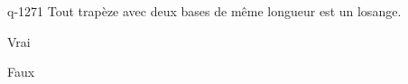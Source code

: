\begin{truefalse}{q-1271}
Tout trapèze avec deux bases de même longueur est un losange.
\item Vrai
\item* Faux
\end{truefalse}

